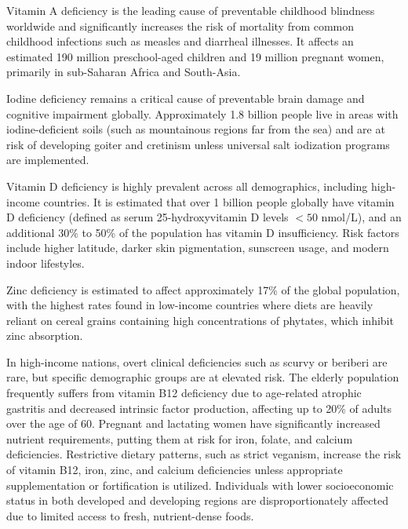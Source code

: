 Vitamin A deficiency is the leading cause of preventable childhood blindness worldwide and significantly increases the risk of mortality from common childhood infections such as measles and diarrheal illnesses. It affects an estimated 190 million preschool-aged children and 19 million pregnant women, primarily in sub-Saharan Africa and South-Asia.

Iodine deficiency remains a critical cause of preventable brain damage and cognitive impairment globally. Approximately 1.8 billion people live in areas with iodine-deficient soils (such as mountainous regions far from the sea) and are at risk of developing goiter and cretinism unless universal salt iodization programs are implemented.

Vitamin D deficiency is highly prevalent across all demographics, including high-income countries. It is estimated that over 1 billion people globally have vitamin D deficiency (defined as serum 25-hydroxyvitamin D levels $< 50$ nmol/L), and an additional 30\% to 50\% of the population has vitamin D insufficiency. Risk factors include higher latitude, darker skin pigmentation, sunscreen usage, and modern indoor lifestyles.

Zinc deficiency is estimated to affect approximately 17\% of the global population, with the highest rates found in low-income countries where diets are heavily reliant on cereal grains containing high concentrations of phytates, which inhibit zinc absorption.

In high-income nations, overt clinical deficiencies such as scurvy or beriberi are rare, but specific demographic groups are at elevated risk. The elderly population frequently suffers from vitamin B12 deficiency due to age-related atrophic gastritis and decreased intrinsic factor production, affecting up to 20\% of adults over the age of 60. Pregnant and lactating women have significantly increased nutrient requirements, putting them at risk for iron, folate, and calcium deficiencies. Restrictive dietary patterns, such as strict veganism, increase the risk of vitamin B12, iron, zinc, and calcium deficiencies unless appropriate supplementation or fortification is utilized. Individuals with lower socioeconomic status in both developed and developing regions are disproportionately affected due to limited access to fresh, nutrient-dense foods.

